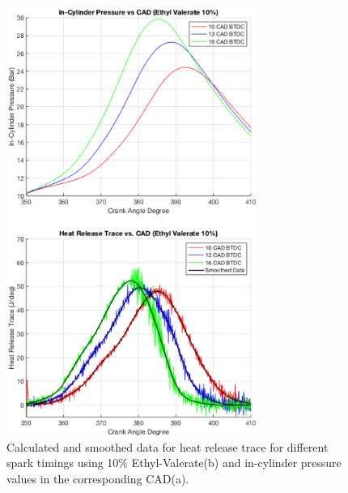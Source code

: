 \documentclass[11pt]{article}
\begin{document}
\begin{figure}[H]
    \centering
    \includegraphics[height = 14cm]{./img/diagram11.png}
    \caption{Calculated and smoothed data for heat release trace for different spark timings using 10\% Ethyl-Valerate(b) and in-cylinder pressure values in the corresponding CAD(a).}
    \label{q1-f4}
\end{figure}
\end{document}

